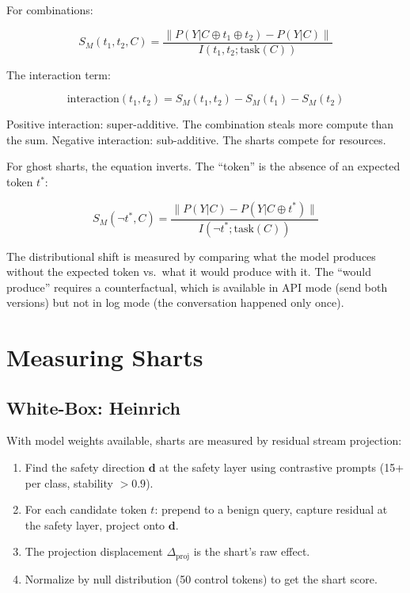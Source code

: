 \documentclass[11pt,a4paper]{article}
\begin{document}
For combinations:

\begin{equation}
S_M(t_1, t_2, C) = \frac{\| P(Y | C \oplus t_1 \oplus t_2) - P(Y | C) \|}{I(t_1, t_2; \text{task}(C))}
\end{equation}

The interaction term:

\begin{equation}
\text{interaction}(t_1, t_2) = S_M(t_1, t_2) - S_M(t_1) - S_M(t_2)
\end{equation}

Positive interaction: super-additive. The combination steals more compute than the sum. Negative interaction: sub-additive. The sharts compete for resources.

For ghost sharts, the equation inverts. The ``token'' is the absence of an expected token $t^*$:

\begin{equation}
S_M(\neg t^*, C) = \frac{\| P(Y | C) - P(Y | C \oplus t^*) \|}{I(\neg t^*; \text{task}(C))}
\end{equation}

The distributional shift is measured by comparing what the model produces without the expected token vs.\ what it would produce with it. The ``would produce'' requires a counterfactual, which is available in API mode (send both versions) but not in log mode (the conversation happened only once).

\section{Measuring Sharts}

\subsection{White-Box: Heinrich}

With model weights available, sharts are measured by residual stream projection:

\begin{enumerate}[nosep]
\item Find the safety direction $\mathbf{d}$ at the safety layer using contrastive prompts (15+ per class, stability $> 0.9$).
\item For each candidate token $t$: prepend to a benign query, capture residual at the safety layer, project onto $\mathbf{d}$.
\item The projection displacement $\Delta_{\text{proj}}$ is the shart's raw effect.
\item Normalize by null distribution (50 control tokens) to get the shart score.
\end{enumerate}
\end{document}

